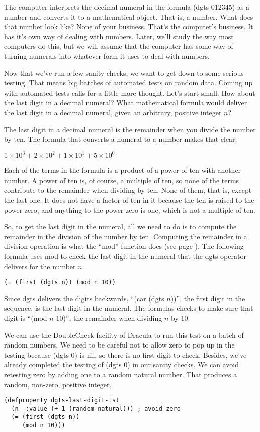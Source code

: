 The computer interprets the decimal numeral in the formula (dgts 012345)
as a number and converts it to a mathematical object. That is, a number.
What does that number look like? None of your business.
That's the computer's business.
It has it's own way of dealing with numbers.
Later, we'll study the way most computers do this,
but we will assume that the computer has some way of turning
numerals into whatever form it uses to deal with numbers.

Now that we've run a few sanity checks, we want to get down to some serious testing.
That means big batches of automated tests on random data.
Coming up with automated tests calls for a little more thought.
Let's start small. How about the last digit in a decimal numeral?
What mathematical formula would deliver the last digit in a
decimal numeral, given an arbitrary, positive integer $n$?

The last digit in a decimal numeral is the remainder when you divide
the number by ten. The formula that converts a numeral to a number
makes that clear.
\begin{center}
$1 \times 10^3 + 2 \times 10^2 + 1 \times 10^1 + 5 \times 10^0$
\end{center}

Each of the terms in the formula is a product of a power
of ten with another number. A power of ten is, of course,
a multiple of ten, so none of the terms contribute to the remainder
when dividing by ten. None of them, that is, except the last one.
It does not have a factor of ten in it because the ten is raised to the
power zero, and anything to the power zero is one, which is not a multiple of ten.

So, to get the last digit in the numeral, all we need to do is to
compute the remainder in the division of the number by ten.
Computing the remainder in a division operation
is what the ``mod'' function does (see page \pageref{mod-function}).
The following formula uses mod to check the last digit in the numeral
that the dgts operator delivers for the number $n$.
\begin{lstlisting}
(= (first (dgts n)) (mod n 10))
\end{lstlisting}

Since dgts delivers the digits backwards,
``(car (dgts $n$))'', the first digit in the sequence,
is the last digit in the numeral.
The formulas checks to make sure that digit is ``(mod $n$ 10)'', the remainder when
dividing $n$ by 10.

We can use the DoubleCheck facility of Dracula to run this test on a batch of random numbers.
We need to be careful not to allow zero to pop up in the testing
because (dgts 0) is nil, so there is no first digit to check.
Besides, we've already completed the testing of (dgts 0) in our sanity checks.
We can avoid retesting zero by adding one to a random natural number.
That produces a random, non-zero, positive integer.
\begin{lstlisting}
(defproperty dgts-last-digit-tst
  (n  :value (+ 1 (random-natural))) ; avoid zero
  (= (first (dgts n))
     (mod n 10)))
\end{lstlisting}

